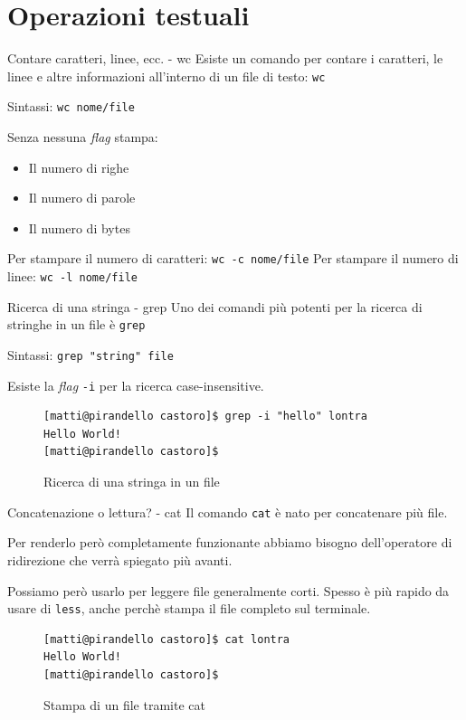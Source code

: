 \documentclass{beamer}
\begin{document}
\section{Operazioni testuali}
\begin{frame}{Contare caratteri, linee, ecc. - wc}
  Esiste un comando per contare i caratteri, le linee e altre informazioni
  all'interno di un file di testo: \texttt{wc}\bigskip

  Sintassi: \texttt{wc nome/file}\bigskip

  Senza nessuna \textit{flag} stampa:
  \begin{itemize}
    \item Il numero di righe
    \item Il numero di parole
    \item Il numero di bytes
  \end{itemize}
  Per stampare il numero di caratteri: \texttt{wc -c nome/file}
  Per stampare il numero di linee: \texttt{wc -l nome/file}
\end{frame}

\begin{frame}[fragile]{Ricerca di una stringa - grep}
  Uno dei comandi più potenti per la ricerca di stringhe in un file è \texttt{grep}\bigskip

  Sintassi: \texttt{grep "string" file}\bigskip

  Esiste la \textit{flag} \texttt{-i} per la ricerca case-insensitive.\bigskip

  \begin{figure}
    \begin{lstlisting}[basicstyle=\footnotesize]
[matti@pirandello castoro]$ grep -i "hello" lontra
Hello World!
[matti@pirandello castoro]$
    \end{lstlisting}
    \caption{Ricerca di una stringa in un file}
  \end{figure}
\end{frame}

\begin{frame}[fragile]{Concatenazione o lettura? - cat}
  Il comando \texttt{cat} è nato per concatenare più file.\bigskip

  Per renderlo però completamente funzionante abbiamo bisogno dell'operatore
  di ridirezione che verrà spiegato più avanti.\bigskip

  Possiamo però usarlo per leggere file generalmente corti. Spesso è più rapido
  da usare di \texttt{less}, anche perchè stampa il file completo sul terminale. \bigskip

  \begin{figure}
    \begin{lstlisting}[basicstyle=\footnotesize]
[matti@pirandello castoro]$ cat lontra
Hello World!
[matti@pirandello castoro]$
    \end{lstlisting}
      \caption{Stampa di un file tramite cat}
  \end{figure}
\end{frame}
\end{document}
